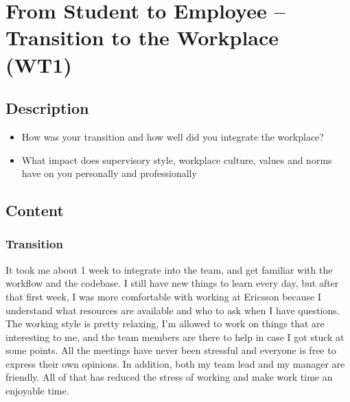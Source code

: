 \newpage
\section{From Student to Employee – Transition to the Workplace (WT1)}

\subsection{Description}

\begin{itemize}
    \item How was your transition and how well did you integrate the workplace?
    \item What impact does supervisory style, workplace culture, values and norms have on you personally and professionally
\end{itemize}

\subsection{Content}

\subsubsection{Transition}
It took me about 1 week to integrate into the team, and get familiar with the workflow and the codebase.
I still have new things to learn every day, but after that first week, I was more comfortable with working at Ericsson because I understand what resources are available and who to ask when I have questions.
The working style is pretty relaxing, I'm allowed to work on things that are interesting to me, and the team members are there to help in case I got stuck at some points.
All the meetings have never been stressful and everyone is free to express their own opinions.
In addition, both my team lead and my manager are friendly.
All of that has reduced the stress of working and make work time an enjoyable time.
